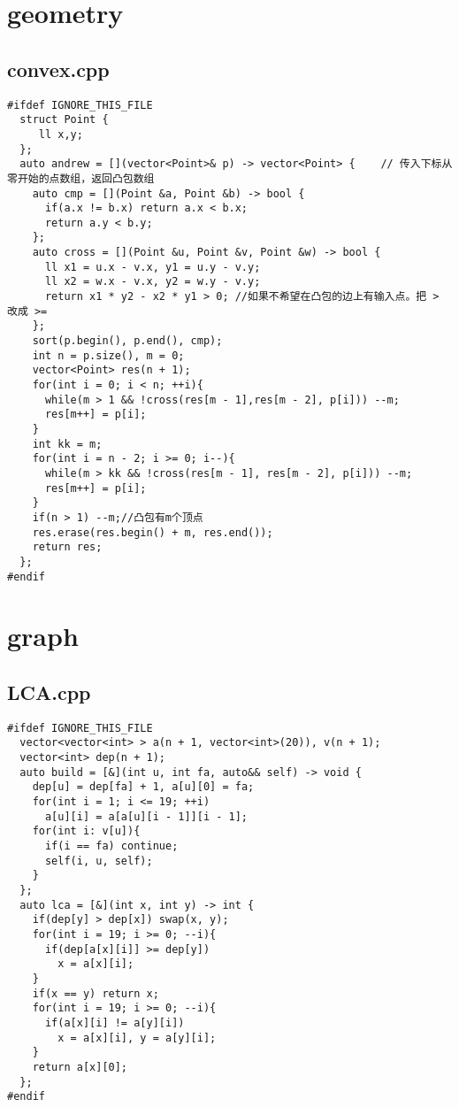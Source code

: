 \documentclass[UTF8, a4paper, titlepage, twoside]{ctexart}
\begin{document}
\clearpage
\section{geometry}
\subsection{convex.cpp}
\begin{verbatim}
#ifdef IGNORE_THIS_FILE
  struct Point {
     ll x,y;
  };
  auto andrew = [](vector<Point>& p) -> vector<Point> {    // 传入下标从零开始的点数组，返回凸包数组
    auto cmp = [](Point &a, Point &b) -> bool {
      if(a.x != b.x) return a.x < b.x;
      return a.y < b.y;
    };
    auto cross = [](Point &u, Point &v, Point &w) -> bool {
      ll x1 = u.x - v.x, y1 = u.y - v.y;
      ll x2 = w.x - v.x, y2 = w.y - v.y;
      return x1 * y2 - x2 * y1 > 0; //如果不希望在凸包的边上有输入点。把 > 改成 >=
    };
    sort(p.begin(), p.end(), cmp);
    int n = p.size(), m = 0;
    vector<Point> res(n + 1);
    for(int i = 0; i < n; ++i){
      while(m > 1 && !cross(res[m - 1],res[m - 2], p[i])) --m;
      res[m++] = p[i];
    }
    int kk = m;
    for(int i = n - 2; i >= 0; i--){
      while(m > kk && !cross(res[m - 1], res[m - 2], p[i])) --m;
      res[m++] = p[i];
    }
    if(n > 1) --m;//凸包有m个顶点
    res.erase(res.begin() + m, res.end());
    return res;
  };
#endif
\end{verbatim}

\clearpage
\section{graph}
\subsection{LCA.cpp}
\begin{verbatim}
#ifdef IGNORE_THIS_FILE
  vector<vector<int> > a(n + 1, vector<int>(20)), v(n + 1);
  vector<int> dep(n + 1);
  auto build = [&](int u, int fa, auto&& self) -> void {
    dep[u] = dep[fa] + 1, a[u][0] = fa;
    for(int i = 1; i <= 19; ++i)
      a[u][i] = a[a[u][i - 1]][i - 1];
    for(int i: v[u]){
      if(i == fa) continue;
      self(i, u, self);
    }
  };
  auto lca = [&](int x, int y) -> int {
    if(dep[y] > dep[x]) swap(x, y);
    for(int i = 19; i >= 0; --i){
      if(dep[a[x][i]] >= dep[y]) 
        x = a[x][i];
    }
    if(x == y) return x;
    for(int i = 19; i >= 0; --i){
      if(a[x][i] != a[y][i])
        x = a[x][i], y = a[y][i];
    }
    return a[x][0];
  };
#endif



\end{verbatim}
\end{document}
